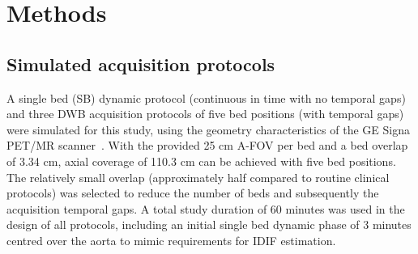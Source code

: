 \section*{Methods}

\subsection*{Simulated acquisition protocols}
A single bed (SB) dynamic protocol (continuous in time with no temporal gaps) and three DWB acquisition protocols of five bed positions (with temporal gaps) were simulated for this study, using the geometry characteristics of the GE Signa PET/MR scanner~\cite{Grant2016}. With the provided 25 cm A-FOV per bed and a bed overlap of 3.34 cm, axial coverage of 110.3 cm can be achieved with five bed positions. The relatively small overlap (approximately half compared to routine clinical protocols) was selected to reduce the number of beds and subsequently the acquisition temporal gaps.
A total study duration of 60 minutes was used in the design of all protocols, including an initial single bed dynamic phase of 3 minutes centred over the aorta to mimic requirements for IDIF estimation.


